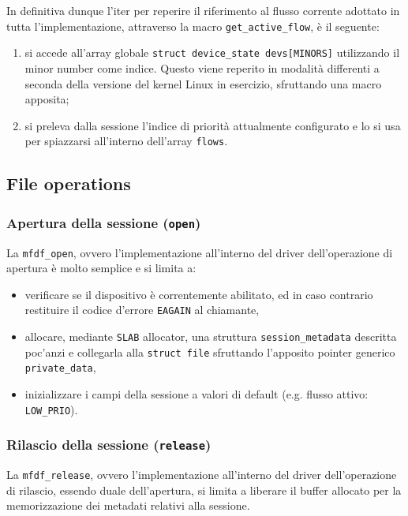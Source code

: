 \documentclass{article}
\begin{document}
In definitiva dunque l'iter per reperire il riferimento al flusso corrente adottato in tutta l'implementazione, attraverso la macro \texttt{get\_active\_flow}, è il seguente:
\begin{enumerate}
        \item si accede all'array globale \texttt{struct device\_state devs[MINORS]} utilizzando il minor number come indice. Questo viene reperito in modalità differenti a seconda della versione del kernel Linux in esercizio, sfruttando una macro apposita;
        \item si preleva dalla sessione l'indice di priorità attualmente configurato e lo si usa per spiazzarsi all'interno dell'array \texttt{flows}.
\end{enumerate}

\subsection{File operations}
\subsubsection{Apertura della sessione (\texttt{open})}
La \texttt{mfdf\_open}, ovvero l'implementazione all'interno del driver dell'operazione di apertura è molto semplice e si limita a:
\begin{itemize}
        \item verificare se il dispositivo è correntemente abilitato, ed in caso contrario restituire il codice d'errore \texttt{EAGAIN} al chiamante,
        \item allocare, mediante \texttt{SLAB} allocator, una struttura \texttt{session\_metadata} descritta poc'anzi e collegarla alla \texttt{struct file} sfruttando l'apposito pointer generico \texttt{private\_data},
        \item inizializzare i campi della sessione a valori di default (e.g. flusso attivo: \texttt{LOW\_PRIO}).
\end{itemize}

\subsubsection{Rilascio della sessione (\texttt{release})}
La \texttt{mfdf\_release}, ovvero l'implementazione all'interno del driver dell'operazione di rilascio, essendo duale dell'apertura, si limita a liberare il buffer allocato per la memorizzazione dei metadati relativi alla sessione.
\end{document}
